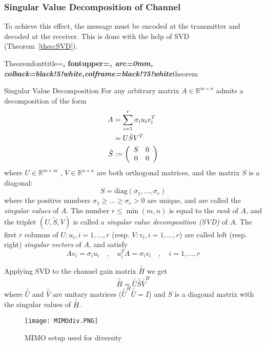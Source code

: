 \subsubsection{Singular Value Decomposition of Channel}
To achieve this effect, the message must be encoded at the transmitter and decoded at the receiver. This is done with the help of SVD (Theorem~\ref{theo:SVD}).

  {Theorem}{fonttitle=\bfseries\upshape, fontupper=\slshape,
     arc=0mm, colback=black!5!white,colframe=black!75!white}{theorem}

\begin{SVD_theo}{Singular Value Decomposition}{}
    For any arbitrary matrix $A \in \mathbb{R}^{m \times n}$ admits a decomposition of the form
    \begin{equation}
        \label{theo:SVD}
        \begin{aligned}
            A &= \sum_{i=1}^{r} \sigma_i u_i v^T_i \\
            &= U \tilde{S} V^T \\
            \tilde{S} &:= \left( \begin{array}{c c}
                S & 0 \\
                0 & 0
            \end{array} \right)
        \end{aligned}
    \end{equation}
    where $U \in \mathbb{R}^{m \times m}$ , $V \in \mathbb{R}^{n \times n}$ are both orthogonal matrices, and the matrix $S$ is a diagonal:
    \[ S = \text{diag}\left( \sigma_1 , \ldots , \sigma_r \right) \]
    where the positive numbers $\sigma_1 \ge \ldots \ge \sigma_r >0$ are unique, and are called the \emph{singular values} of $A$.
    The number $r \leq \min(m,n)$ is equal to the \emph{rank} of $A$, and the triplet $(U,\tilde{{S}},V)$ is called a \emph{singular value decomposition (SVD)} of $A$.
    The first $r$ columns of $U: u_i, i=1,\ldots,r$ (resp. $V: v_i, i=1,\ldots,r$) are called left (resp. right) \emph{singular vectors} of $A$, and satisfy
    \[ Av_i = \sigma_i u_i \quad , \quad u_i^T A = \sigma_i v_i \quad , \quad i = 1,\ldots,r \]

\end{SVD_theo}

Applying SVD to the channel gain matrix $\bar{\bar{H}}$ we get
\begin{equation}
    \label{eq:SVD H}
    \bar{\bar{H}} = \bar{\bar{U}} \bar{\bar{S}} \bar{\bar{V}}^H
\end{equation}
where $\bar{\bar{U}}$ and $\bar{\bar{V}}$ are unitary matrices ($\bar{\bar{U}}^H\bar{\bar{U}} = I$) and $S$ is a diagonal matrix with the singular values of $\bar{\bar{H}}$.
\begin{figure}[ht]
    \centering
    \texttt{[image: MIMOdiv.PNG]}
    \caption{MIMO setup used for diversity}
    \label{fig:MIMOdiv}
\end{figure}

